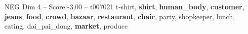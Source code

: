 \begin{textsample}{NEG Dim 4 – Score -3.00 – t007021}  \label{ex:f4_neg_003}
t-shirt, \textbf{shirt}, \textbf{human\_body}, \textbf{customer}, \textbf{jeans}, \textbf{food}, \textbf{crowd}, \textbf{bazaar}, \textbf{restaurant}, \textbf{chair}, party, shopkeeper, lunch, eating, dai\_pai\_dong, \textbf{market}, produce

\end{textsample}
